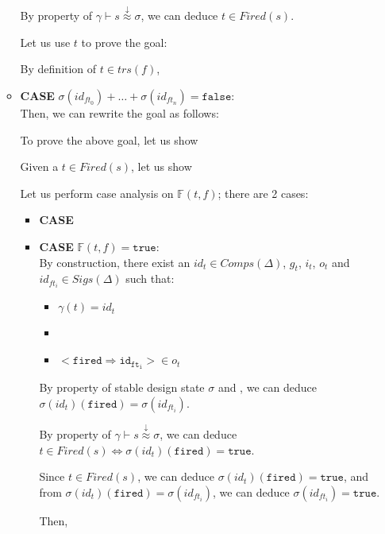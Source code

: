 \documentclass[dvipsnames,12pt]{article}
\begin{document}
\begin{niproof}
\begin{itemize}
\begin{itemize}
      By property of
      $\gamma\vdash{}s\stackrel{\downarrow}{\approx}\sigma$, we can
      deduce $t\in{}Fired(s)$.
      
      Let us use $t$ to prove the goal:

      By definition of $t\in{}trs(f)$,

    \item \textbf{CASE} $\sigma(id_{ft_0})+\dots+\sigma(id_{ft_n})=\mathtt{false}$:\\
      \noindent{}Then, we can rewrite the goal as follows:

      \noindent{}To prove the above goal, let us show

      \noindent{}Given a $t\in{}Fired(s)$, let us show

      \noindent{}Let us perform case analysis on $\mathbb{F}(t,f)$; there are 2 cases:

      \begin{itemize}
      \item \textbf{CASE} 
      \item \textbf{CASE} $\mathbb{F}(t,f)=\mathtt{true}$:\\
        
        By construction, there exist an $id_{t}\in{}Comps(\Delta)$,
        $g_{t}$, $i_{t}$, $o_{t}$ and
        $id_{ft_i}\in{}Sigs(\Delta)$ such that:
        \begin{itemize}
        \item $\gamma(t)=id_{t}$
        \item \InCsCompT
        \item ${<}\mathtt{fired\Rightarrow{id_{ft_i}}}{>}\in{}o_{t}$
        \end{itemize}

        By property of stable design state $\sigma$ and \InCsCompT, we
        can deduce $\sigma(id_t)(\texttt{fired})=\sigma(id_{ft_i})$.

        By property of
        $\gamma\vdash{}s\stackrel{\downarrow}{\approx}\sigma$, we can
        deduce
        $t\in{}Fired(s)\Leftrightarrow{}\sigma(id_t)(\texttt{fired})=\mathtt{true}$.

        \noindent{}Since $t\in{}Fired(s)$, we can deduce
        $\sigma(id_t)(\texttt{fired})=\mathtt{true}$, and from
        $\sigma(id_t)(\texttt{fired})=\sigma(id_{ft_i})$, we can deduce
        $\sigma(id_{ft_i})=\mathtt{true}$.

        Then, 
      \end{itemize}
    \end{itemize}
  \end{itemize}
\end{niproof}
\end{document}
